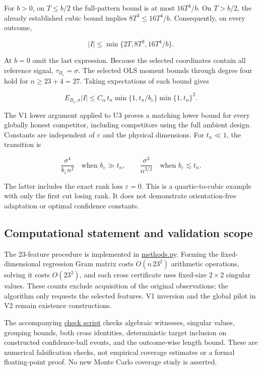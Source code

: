 \documentclass[
  11pt,
]{article}
\begin{document}
For \(b>0\), on \(T\le b/2\) the full-pattern bound is at most
\(16T^4/b\). On \(T>b/2\), the already established cubic bound implies
\(8T^3\le16T^4/b\). Consequently, on every outcome,

\[|I|\le\min\{2T,8T^3,16T^4/b\}.\tag{V3a}\]

At \(b=0\) omit the last expression. Because the selected coordinates
contain all reference signal, \(\tau_{B_\varepsilon}=\sigma\). The
selected OLS moment bounds through degree four hold for \(n\ge23+4=27\).
Taking expectations of each bound gives

\[E_{B_\varepsilon,\sigma}|I|
\le C_\alpha\,t_n\min\{1,t_n/b_\varepsilon\}\min\{1,t_n\}^2.\tag{V3b}\]

The V1 lower argument applied to U3 proves a matching lower bound for
every globally honest competitor, including competitors using the full
ambient design. Constants are independent of \(\varepsilon\) and the
physical dimensions. For \(t_n\ll1\), the transition is

\[\frac{\sigma^4}{b_\varepsilon n^2}
\quad\text{when }b_\varepsilon\gg t_n,
\qquad
\frac{\sigma^3}{n^{3/2}}
\quad\text{when }b_\varepsilon\lesssim t_n.\]

The latter includes the exact rank loss \(\varepsilon=0\). This is a
quartic-to-cubic example with only the first cut losing rank. It does
not demonstrate orientation-free adaptation or optimal confidence
constants.

\subsection{Computational statement and validation
scope}\label{computational-statement-and-validation-scope}

The 23-feature procedure is implemented in
\href{../../simulations/code/unequal_bonds/methods.py}{methods.py}.
Forming the fixed-dimensional regression Gram matrix costs
\(O(n\,23^2)\) arithmetic operations, solving it costs \(O(23^3)\), and
each cross certificate uses fixed-size \(2\times2\) singular values.
These counts exclude acquisition of the original observations; the
algorithm only requests the selected features. V1 inversion and the
global pilot in V2 remain existence constructions.

The accompanying
\href{../../simulations/code/unequal_bonds/check_theory.py}{check
script} checks algebraic witnesses, singular values, grouping bounds,
both cross identities, deterministic target inclusion on constructed
confidence-ball events, and the outcome-wise length bound. These are
numerical falsification checks, not empirical coverage estimates or a
formal floating-point proof. No new Monte Carlo coverage study is
asserted.
\end{document}

